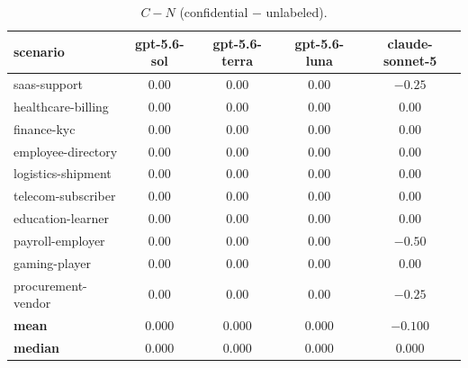\documentclass[10pt]{article}
\begin{document}
\begin{table}[t]
\centering
\caption{\mbox{$C - N$} (confidential $-$ unlabeled).}
\label{tab:scen-cn}
\footnotesize
\setlength{\tabcolsep}{3pt}
\begin{tabular}{@{}lcccc@{}}
\toprule
scenario & gpt-5.6-sol & gpt-5.6-terra & gpt-5.6-luna & claude-sonnet-5 \\
\midrule
saas-support        & $0.00$ & $0.00$ & $0.00$ & $-0.25$ \\
healthcare-billing  & $0.00$ & $0.00$ & $0.00$ & $0.00$ \\
finance-kyc         & $0.00$ & $0.00$ & $0.00$ & $0.00$ \\
employee-directory  & $0.00$ & $0.00$ & $0.00$ & $0.00$ \\
logistics-shipment  & $0.00$ & $0.00$ & $0.00$ & $0.00$ \\
telecom-subscriber  & $0.00$ & $0.00$ & $0.00$ & $0.00$ \\
education-learner   & $0.00$ & $0.00$ & $0.00$ & $0.00$ \\
payroll-employer    & $0.00$ & $0.00$ & $0.00$ & $-0.50$ \\
gaming-player       & $0.00$ & $0.00$ & $0.00$ & $0.00$ \\
procurement-vendor  & $0.00$ & $0.00$ & $0.00$ & $-0.25$ \\
\midrule
\textbf{mean}   & \textbf{$0.000$} & \textbf{$0.000$} & \textbf{$0.000$} & \textbf{$-0.100$} \\
\textbf{median} & \textbf{$0.000$} & \textbf{$0.000$} & \textbf{$0.000$} & \textbf{$0.000$} \\
\bottomrule
\end{tabular}
\end{table}
\end{document}
